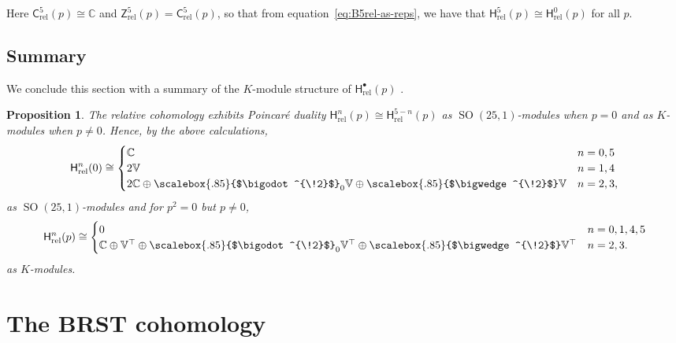 \documentclass[11pt,reqno,a4paper,final]{amsart}
\newcommand\ext[1]{\scalebox{.85}{$\bigwedge^{\!#1}$}}
\newcommand\sym[1]{\scalebox{.85}{$\bigodot^{\!#1}$}}
\theoremstyle{plain}
\newtheorem{proposition}[lemma]{Proposition}
\theoremstyle{definition}
\newcommand{\Crel}{\mathsf{C}_{\mathrm{rel}}} %
\newcommand{\Hrel}{\mathsf{H}_{\mathrm{rel}}}
\newcommand{\Zrel}{\mathsf{Z}_{\mathrm{rel}}}
\newcommand{\VV}{\mathbb{V}}
\newcommand{\CC}{\mathbb{C}}
\newcommand{\1}{\mathbb{1}}
\newcommand{\SO}{\operatorname{SO}}
\numberwithin{equation}{section}
\begin{document}
Here $\Crel^5(p) \cong \CC$ and $\Zrel^5(p) = \Crel^5(p)$, so that
from equation~\eqref{eq:B5rel-as-reps}, we have that $\Hrel^5(p) \cong
\Hrel^0(p)$ for all $p$.

\subsection{Summary}
\label{sec:hrel-summary}

We conclude this section with a summary of the $K$-module structure of $\Hrel^\bullet(p)$ . 

\begin{proposition}\label{prop:Hrel}
  The relative cohomology exhibits Poincaré duality $\Hrel^n(p) \cong
  \Hrel^{5-n}(p)$ as $\SO(25,1)$-modules when $p=0$ and as $K$-modules when $p \neq 0$. 
  Hence, by the above calculations,
  \begin{equation}
    \Hrel^n(0) \cong
    \begin{cases}
      \CC & n = 0,5\\
      2 \VV & n = 1,4\\
      2 \CC \oplus \sym{2}_0 \VV \oplus \ext{2} \VV & n = 2,3,
    \end{cases}
  \end{equation}
  as $\SO(25,1)$-modules
  and for $p^2 = 0$ but $p\neq 0$,
  \begin{equation}
    \Hrel^n(p) \cong
    \begin{cases}
      0 & n = 0,1,4,5\\
      \CC \oplus \VV^\top \oplus \sym{2}_0 \VV^\top \oplus \ext{2} \VV^\top & n = 2,3.
    \end{cases}
  \end{equation}
  as $K$-modules.
\end{proposition}

\section{The BRST cohomology}
\label{sec:brst-cohomology}
\end{document}
